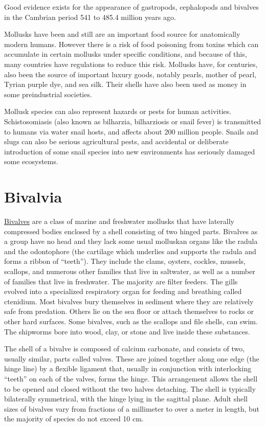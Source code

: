Good evidence exists for the appearance of gastropods, cephalopods and
bivalves in the Cambrian period 541 to 485.4 million years ago.

Mollusks have been and still are an important food source for
anatomically modern humans. However there is a risk of food poisoning
from toxins which can accumulate in certain mollusks under specific
conditions, and because of this, many countries have regulations to
reduce this risk. Mollusks have, for centuries, also been the source of
important luxury goods, notably pearls, mother of pearl, Tyrian purple
dye, and sea silk. Their shells have also been used as money in some
preindustrial societies.

Mollusk species can also represent hazards or pests for human
activities. Schistosomiasis (also known as bilharzia, bilharziosis or
snail fever) is transmitted to humans via water snail hosts, and affects
about 200 million people. Snails and slugs can also be serious
agricultural pests, and accidental or deliberate introduction of some
snail species into new environments has seriously damaged some
ecosystems.

\section{Bivalvia}\label{bivalvia}

\href{https://en.wikipedia.org/wiki/Bivalvia}{Bivalves} are a class of
marine and freshwater mollusks that have laterally compressed bodies
enclosed by a shell consisting of two hinged parts. Bivalves as a group
have no head and they lack some usual molluskan organs like the radula
and the odontophore (the cartilage which underlies and supports the
radula and forms a ribbon of ``teeth''). They include the clams,
oysters, cockles, mussels, scallops, and numerous other families that
live in saltwater, as well as a number of families that live in
freshwater. The majority are filter feeders. The gills evolved into a
specialized respiratory organ for feeding and breathing called
ctenidium. Most bivalves bury themselves in sediment where they are
relatively safe from predation. Others lie on the sea floor or attach
themselves to rocks or other hard surfaces. Some bivalves, such as the
scallops and file shells, can swim. The shipworms bore into wood, clay,
or stone and live inside these substances.

The shell of a bivalve is composed of calcium carbonate, and consists of
two, usually similar, parts called valves. These are joined together
along one edge (the hinge line) by a flexible ligament that, usually in
conjunction with interlocking ``teeth'' on each of the valves, forms the
hinge. This arrangement allows the shell to be opened and closed without
the two halves detaching. The shell is typically bilaterally
symmetrical, with the hinge lying in the sagittal plane. Adult shell
sizes of bivalves vary from fractions of a millimeter to over a meter in
length, but the majority of species do not exceed 10 cm.

